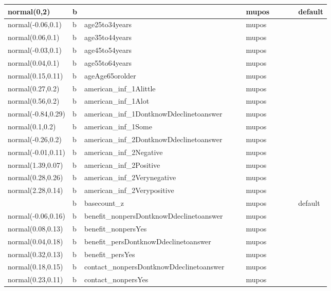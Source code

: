 \documentclass[
]{book}
\theoremstyle{definition}
\theoremstyle{definition}
\theoremstyle{definition}
\theoremstyle{definition}
\theoremstyle{remark}
\begin{document}
\begin{table}
\begin{tabular}[t]{l|l|l|l|l|l|l|l|l|l}
\hline
normal(0,2) & b &  &  &  & mupos &  &  &  & default\\
\hline
normal(-0.06,0.1) & b & age25to34years &  &  & mupos &  &  &  & \\
\hline
normal(0.06,0.1) & b & age35to44years &  &  & mupos &  &  &  & \\
\hline
normal(-0.03,0.1) & b & age45to54years &  &  & mupos &  &  &  & \\
\hline
normal(0.04,0.1) & b & age55to64years &  &  & mupos &  &  &  & \\
\hline
normal(0.15,0.11) & b & ageAge65orolder &  &  & mupos &  &  &  & \\
\hline
normal(0.27,0.2) & b & american\_inf\_1Alittle &  &  & mupos &  &  &  & \\
\hline
normal(0.56,0.2) & b & american\_inf\_1Alot &  &  & mupos &  &  &  & \\
\hline
normal(-0.84,0.29) & b & american\_inf\_1DontknowDdeclinetoanswer &  &  & mupos &  &  &  & \\
\hline
normal(0.1,0.2) & b & american\_inf\_1Some &  &  & mupos &  &  &  & \\
\hline
normal(-0.26,0.2) & b & american\_inf\_2DontknowDdeclinetoanswer &  &  & mupos &  &  &  & \\
\hline
normal(-0.01,0.11) & b & american\_inf\_2Negative &  &  & mupos &  &  &  & \\
\hline
normal(1.39,0.07) & b & american\_inf\_2Positive &  &  & mupos &  &  &  & \\
\hline
normal(0.28,0.26) & b & american\_inf\_2Verynegative &  &  & mupos &  &  &  & \\
\hline
normal(2.28,0.14) & b & american\_inf\_2Verypositive &  &  & mupos &  &  &  & \\
\hline
 & b & basecount\_z &  &  & mupos &  &  &  & default\\
\hline
normal(-0.06,0.16) & b & benefit\_nonpersDontknowDdeclinetoanswer &  &  & mupos &  &  &  & \\
\hline
normal(0.08,0.13) & b & benefit\_nonpersYes &  &  & mupos &  &  &  & \\
\hline
normal(0.04,0.18) & b & benefit\_persDontknowDdeclinetoanswer &  &  & mupos &  &  &  & \\
\hline
normal(0.32,0.13) & b & benefit\_persYes &  &  & mupos &  &  &  & \\
\hline
normal(0.18,0.15) & b & contact\_nonpersDontknowDdeclinetoanswer &  &  & mupos &  &  &  & \\
\hline
normal(0.23,0.11) & b & contact\_nonpersYes &  &  & mupos &  &  &  & \\

\end{tabular}
\end{table}
\end{document}

